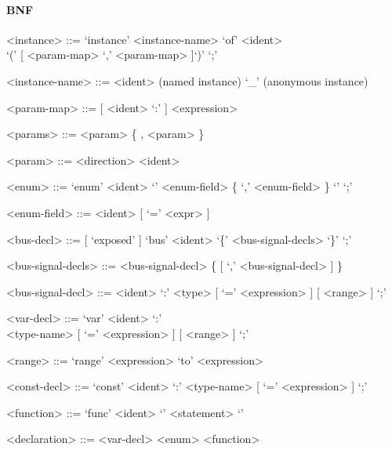 \documentclass{article}
\begin{document}
\paragraph{BNF}
\begin{grammar}

  <instance> ::= `instance' <instance-name> `of' <ident> \\`(' [ <param-map> { `,' <param-map> } ]`)' `;'

  <instance-name> ::= <ident> (named instance)
  \alt `_' (anonymous instance)

  <param-map> ::= [ <ident> `:' ] <expression>

  <params> ::= <param> \{ , <param> \}

  <param> ::= <direction> <ident>

  <enum> ::= `enum' <ident> `{' <enum-field> \{ `,' <enum-field>  \} `}' `;'

  <enum-field> ::= <ident> [ `=' <expr> ]

  <bus-decl> ::= [ `exposed' ] `bus' <ident> `\{' <bus-signal-decls> `\}'  `;'

  <bus-signal-decls> ::= <bus-signal-decl> \{ [ `,' <bus-signal-decl> ] \}

  <bus-signal-decl> ::= <ident> `:' <type> [ `=' <expression> ] [ <range> ] `;'

  <var-decl> ::= `var' <ident> `:' \\ <type-name> [ `=' <expression> ] [ <range> ] `;'

  <range> ::= `range' <expression> `to' <expression>

  <const-decl> ::= `const' <ident> `:' <type-name> [ `=' <expression> ] `;'

  <function> ::= `func' <ident> `{' { <statement> } `}'

  <declaration> ::= <var-decl>
  \alt <enum>
  \alt <function>

\end{grammar}
\end{document}
